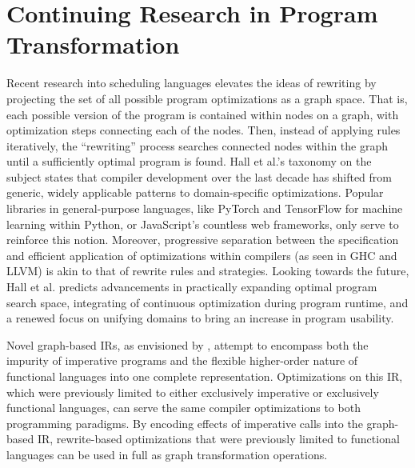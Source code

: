 \documentclass{article}
\begin{document}
\section{Continuing Research in Program Transformation}
Recent research into scheduling languages \cite{hagedorn2020Achieving,hall2024schedulinglanguagespastpresent} elevates the ideas of rewriting by projecting the set of all possible program optimizations as a graph space. That is, each possible version of the program is contained within nodes on a graph, with optimization steps connecting each of the nodes. Then, instead of applying rules iteratively, the ``rewriting'' process searches connected nodes within the graph until a sufficiently optimal program is found. Hall et al.'s taxonomy on the subject \cite{hall2024schedulinglanguagespastpresent} states that compiler development over the last decade has shifted from generic, widely applicable patterns to domain-specific optimizations. Popular libraries in general-purpose languages, like PyTorch and TensorFlow for machine learning within Python, or JavaScript's countless web frameworks, only serve to reinforce this notion. Moreover, progressive separation between the specification and efficient application of optimizations within compilers (as seen in GHC and LLVM) is akin to that of rewrite rules and strategies. Looking towards the future, Hall et al. predicts advancements in practically expanding optimal program search space, integrating of continuous optimization during program runtime, and a renewed focus on unifying domains to bring an increase in program usability.

Novel graph-based IRs, as envisioned by \cite{bravecevac2023GraphIRs}, attempt to encompass both the impurity of imperative programs and the flexible higher-order nature of functional languages into one complete representation. Optimizations on this IR, which were previously limited to either exclusively imperative or exclusively functional languages, can serve the same compiler optimizations to both programming paradigms. By encoding effects of imperative calls into the graph-based IR, rewrite-based optimizations that were previously limited to functional languages can be used in full as graph transformation operations.
\end{document}
